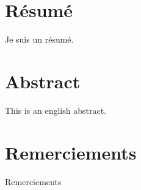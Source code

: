 



\cleardoublepage
\begin{minipage}{\linewidth}

\chapter*{Résumé}
Je suis un résumé.

\chapter*{Abstract}
This is an english abstract.

\end{minipage}
\cleardoublepage



\chapter*{Remerciements}
Remerciements






\cleardoublepage



